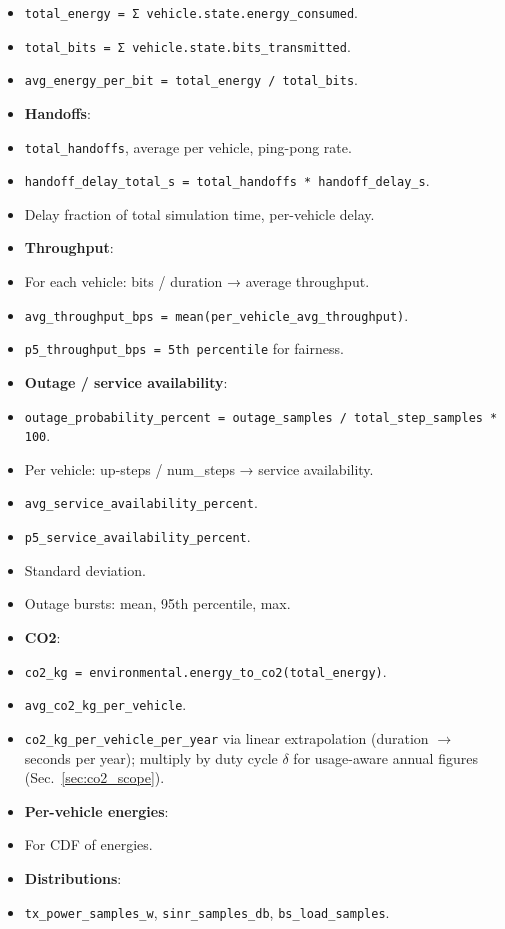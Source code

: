 \documentclass[conference]{IEEEtran}
\begin{document}
\begin{itemize}
\item \texttt{total\_energy = Σ vehicle.state.energy\_consumed}.
\item \texttt{total\_bits = Σ vehicle.state.bits\_transmitted}.
\item \texttt{avg\_energy\_per\_bit = total\_energy / total\_bits}.
\item \textbf{Handoffs}:
\item \texttt{total\_handoffs}, average per vehicle, ping-pong rate.
\item \texttt{handoff\_delay\_total\_s = total\_handoffs * handoff\_delay\_s}.
\item Delay fraction of total simulation time, per-vehicle delay.
\item \textbf{Throughput}:
\item For each vehicle: bits / duration → average throughput.
\item \texttt{avg\_throughput\_bps = mean(per\_vehicle\_avg\_throughput)}.
\item \texttt{p5\_throughput\_bps = 5th percentile} for fairness.
\item \textbf{Outage / service availability}:
\item \texttt{outage\_probability\_percent = outage\_samples / total\_step\_samples * 100}.
\item Per vehicle: up-steps / num_steps → service availability.
\item \texttt{avg\_service\_availability\_percent}.
\item \texttt{p5\_service\_availability\_percent}.
\item Standard deviation.
\item Outage bursts: mean, 95th percentile, max.
\item \textbf{CO2}:
\item \texttt{co2\_kg = environmental.energy\_to\_co2(total\_energy)}.
\item \texttt{avg\_co2\_kg\_per\_vehicle}.
\item \texttt{co2\_kg\_per\_vehicle\_per\_year} via linear extrapolation (duration $\rightarrow$ seconds per year); multiply by duty cycle $\delta$ for usage-aware annual figures (Sec.~\ref{sec:co2_scope}).
\item \textbf{Per-vehicle energies}:
\item For CDF of energies.
\item \textbf{Distributions}:
\item \texttt{tx\_power\_samples\_w}, \texttt{sinr\_samples\_db}, \texttt{bs\_load\_samples}.

\end{itemize}
\end{document}
